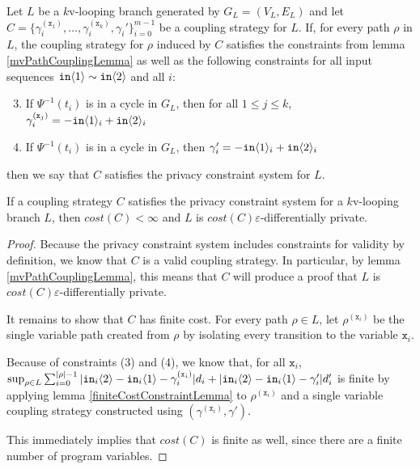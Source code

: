 \begin{defn}\label{mvPrivacyConstraintSystem}
    Let $L$ be a $k$v-looping branch generated by $G_L = (V_L, E_L)$ and let $C = \{\gamma_i^{(\texttt{x}_1)},\ldots, \gamma_i^{(\texttt{x}_k)}, \gamma_i'\}_{i=0}^{m-1}$ be a coupling strategy for $L$. If, for every path $\rho$ in $L$, the coupling strategy for $\rho$ induced by $C$ satisfies the constraints from lemma \ref{mvPathCouplingLemma} as well as the following constraints for all input sequences $\texttt{in}\langle1 \rangle\sim\texttt{in}\langle2 \rangle$ and all $i$: \begin{enumerate}
        \setcounter{enumi}{2}
        \item If $\Psi^{-1}(t_i)$ is in a cycle in $G_L$, then for all $1\leq j\leq k$, $\gamma_i^{(\texttt{x}_j)} = -\texttt{in}\langle1 \rangle_i+\texttt{in}\langle2 \rangle_i$
        \item If $\Psi^{-1}(t_i)$ is in a cycle in $G_L$, then $\gamma_i' = -\texttt{in}\langle1 \rangle_i+\texttt{in}\langle2 \rangle_i$
    \end{enumerate}
    then we say that $C$ satisfies the privacy constraint system for $L$. 
\end{defn}

\begin{lemma}
    If a coupling strategy $C$ satisfies the privacy constraint system for a $k$v-looping branch $L$, then $cost(C)<\infty$ and $L$ is $cost(C)\varepsilon$-differentially private. 
\end{lemma}

\begin{proof}
    Because the privacy constraint system includes constraints for validity by definition, we know that $C$ is a valid coupling strategy. In particular, by lemma \ref{mvPathCouplingLemma}, this means that $C$ will produce a proof that $L$ is $cost(C)\varepsilon$-differentially private. 
    
    It remains to show that $C$ has finite cost. For every path $\rho\in L$, let $\rho^{(\texttt{x}_i)}$ be the single variable path created from $\rho$ by isolating every transition to the variable $\texttt{x}_i$. 

    Because of constraints (3) and (4), we know that, for all $\texttt{x}_i$, $\sup_{\rho\in L}\sum_{i=0}^{|\rho|-1}|\texttt{in}_i\langle2 \rangle-\texttt{in}_i\langle1 \rangle-\gamma_i^{(\texttt{x}_i)}|d_i + |\texttt{in}_i\langle2 \rangle-\texttt{in}_i\langle1 \rangle-\gamma_i'|d_i'$ is finite by applying lemma \ref{finiteCostConstraintLemma} to $\rho^{(\texttt{x}_i)}$ and a single variable coupling strategy constructed using $(\gamma^{(\texttt{x}_i)}, \gamma')$. 

    This immediately implies that $cost(C)$ is finite as well, since there are a finite number of program variables. 
\end{proof}

